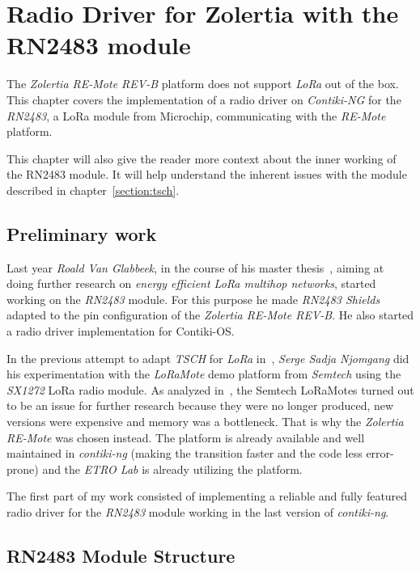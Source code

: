 \chapter{Radio Driver for Zolertia with the RN2483 module\label{section:radio}}

The \emph{Zolertia RE-Mote REV-B} platform does not support \emph{LoRa} out of
the box. This chapter covers the implementation of a radio driver on
\emph{Contiki-NG} for the \emph{RN2483}, a LoRa module from Microchip,
communicating with the \emph{RE-Mote} platform.

This chapter will also give the reader more context about the inner working of
the RN2483 module.
It will help understand the inherent issues with the module
described in chapter~\ref{section:tsch}.

\section{Preliminary work}

Last year \emph{Roald Van Glabbeek}, in the course of his master thesis~\cite{8847137}, 
aiming at doing further research on \emph{energy efficient LoRa multihop networks}, 
started working on the \emph{RN2483} module.
For this purpose he made \emph{RN2483 Shields} adapted to the pin
configuration of the \emph{Zolertia RE-Mote REV-B}. He also started a radio driver
implementation for Contiki-OS\@.

In the previous attempt to adapt \emph{TSCH} for \emph{LoRa}
in~\cite{njomgang_2018}, \emph{Serge Sadja Njomgang} did his experimentation with 
the \emph{LoRaMote} demo platform from \emph{Semtech} using the \emph{SX1272} LoRa 
radio module.
As analyzed in~\cite{8847137}, the Semtech LoRaMotes turned out to be an issue for
further research because they were no longer produced, 
new versions were expensive and memory was a bottleneck.
That is why the \emph{Zolertia RE-Mote} was chosen instead. 
The platform is already available and well maintained in \emph{contiki-ng}
(making the transition faster and the code less error-prone) and the \emph{ETRO
Lab} is already utilizing the platform.

The first part of my work consisted of implementing a reliable
and fully featured radio driver for the \emph{RN2483} module working in the last
version of \emph{contiki-ng}.

\section{RN2483 Module Structure}


